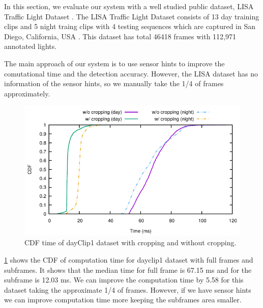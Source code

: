 In this section, we evaluate our system with a well studied public dataset, LISA Traffic Light Dataset \cite{lisa}.
The LISA Traffic Light Dataset consists of 13 day training clips and 5 night traing clips with 4 testing sequences which are captured in San Diego, California, USA \cite{lisa2}.
This dataset has total 46418 frames with 112,971 annotated lights.

The main approach of our system is to use sensor hints to improve the comutational time and the detection accuracy.
However, the LISA dataset has no information of the sensor hints, so we manually take the 1/4 of frames approximately.


\begin{figure}[ht!]
  \centering
  \includegraphics[width=5.2in]{plots/lisacdf.pdf}
  \caption{CDF time of dayClip1 dataset with cropping and without cropping.}
  \label{f:lisa_cdf}
\end{figure}

\ref{f:lisa_cdf} shows the CDF of computation time for dayclip1 dataset with full frames and subframes.
It shows that the median time for full frame is 67.15 ms and for the subframe is 12.03 ms.
We can improve the computation time by 5.58 for this dataset taking the approximate 1/4 of frames.
However, if we have sensor hints we can improve computation time more keeping the subframes area smaller.




